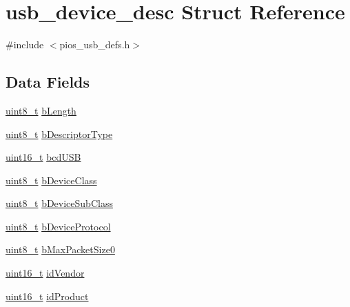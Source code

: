 \hypertarget{structusb__device__desc}{\section{usb\-\_\-device\-\_\-desc Struct Reference}
\label{structusb__device__desc}
}


{\ttfamily \#include $<$pios\-\_\-usb\-\_\-defs.\-h$>$}

\subsection*{Data Fields}
\begin{DoxyCompactItemize}
\item 
\hyperlink{stdint_8h_aba7bc1797add20fe3efdf37ced1182c5}{uint8\-\_\-t} \hyperlink{group___p_i_o_s___u_s_b___d_e_f_s_gae982ead8e11c6f9bd465132001f83c11}{b\-Length}
\item 
\hyperlink{stdint_8h_aba7bc1797add20fe3efdf37ced1182c5}{uint8\-\_\-t} \hyperlink{group___p_i_o_s___u_s_b___d_e_f_s_gaa704e180aaabca3aa213472f102bd91e}{b\-Descriptor\-Type}
\item 
\hyperlink{stdint_8h_a273cf69d639a59973b6019625df33e30}{uint16\-\_\-t} \hyperlink{group___p_i_o_s___u_s_b___d_e_f_s_ga9f1c1b7e10dd6118532befba9204375c}{bcd\-U\-S\-B}
\item 
\hyperlink{stdint_8h_aba7bc1797add20fe3efdf37ced1182c5}{uint8\-\_\-t} \hyperlink{group___p_i_o_s___u_s_b___d_e_f_s_ga04601bd230a37ec17da04c14036b4094}{b\-Device\-Class}
\item 
\hyperlink{stdint_8h_aba7bc1797add20fe3efdf37ced1182c5}{uint8\-\_\-t} \hyperlink{group___p_i_o_s___u_s_b___d_e_f_s_ga020d77d32b45dfd9fe9991cd975dddd7}{b\-Device\-Sub\-Class}
\item 
\hyperlink{stdint_8h_aba7bc1797add20fe3efdf37ced1182c5}{uint8\-\_\-t} \hyperlink{group___p_i_o_s___u_s_b___d_e_f_s_ga3d64799ad816edeb66ecba053618b8aa}{b\-Device\-Protocol}
\item 
\hyperlink{stdint_8h_aba7bc1797add20fe3efdf37ced1182c5}{uint8\-\_\-t} \hyperlink{group___p_i_o_s___u_s_b___d_e_f_s_gaf24518f19202bda273da937e32dff924}{b\-Max\-Packet\-Size0}
\item 
\hyperlink{stdint_8h_a273cf69d639a59973b6019625df33e30}{uint16\-\_\-t} \hyperlink{group___p_i_o_s___u_s_b___d_e_f_s_ga4bafd49b2f07a14cb215c8cfe917ad5a}{id\-Vendor}
\item 
\hyperlink{stdint_8h_a273cf69d639a59973b6019625df33e30}{uint16\-\_\-t} \hyperlink{group___p_i_o_s___u_s_b___d_e_f_s_gad96a4bfe2eaf1a6556d633bb896a8683}{id\-Product}

\end{DoxyCompactItemize}
